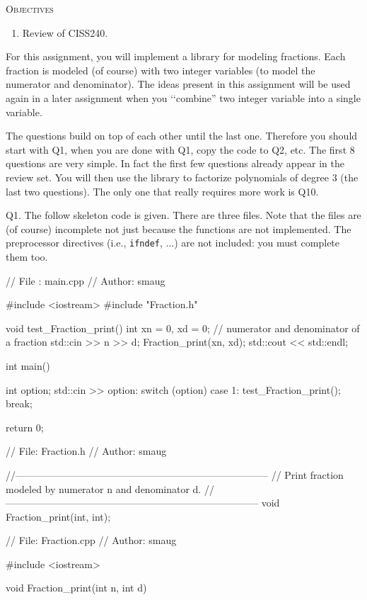 



\renewcommand\TITLE{Assignment 2 (Review)}


\topmatter


\textsc{Objectives}
\begin{enumerate}
\item Review of CISS240.
\end{enumerate}


For this assignment, you will implement a library for
modeling fractions.
Each fraction is modeled (of course) with two integer variables
(to model the numerator and denominator).
The ideas present in this assignment will be used again in a later assignment
when you \lq\lq combine'' two integer variable into a single variable.

The questions build on top of each other until the last one.
Therefore you should start with Q1, when you are done with Q1, copy the code to Q2, etc.
The first 8 questions are very simple.
In fact the first few questions already appear in the review set.
You will then use the library to factorize polynomials of degree 3 (the last two questions).
The only one that really requires more work is Q10.



\newpage
Q1.
The follow skeleton code is given. There are three files.
Note that the files are (of course) incomplete not just because the
functions are not implemented.
The preprocessor directives (i.e., \verb!ifndef!, ...) are not included:
you must complete them too.

{\small
\begin{console}
// File  : main.cpp
// Author: smaug

#include <iostream>
#include "Fraction.h"

void test_Fraction_print()
{
    int xn = 0, xd = 0; // numerator and denominator of a fraction
    std::cin >> n >> d;
    Fraction_print(xn, xd);
    std::cout << std::endl;
}


int main()
{
    int option;
    std::cin >> option:
    switch (option)
    {
        case 1:
            test_Fraction_print();
            break;
    }
    
    return 0;
}
\end{console}
\begin{console}
// File: Fraction.h
// Author: smaug

//-----------------------------------------------------------------------------
// Print fraction modeled by numerator n and denominator d.
//-----------------------------------------------------------------------------
void Fraction_print(int, int);

\end{console}
\begin{console}
// File: Fraction.cpp
// Author: smaug

#include <iostream>


void Fraction_print(int n, int d)
{
}
\end{console}
}

